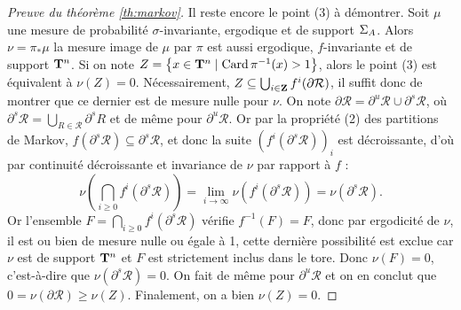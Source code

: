 \begin{proof}[Preuve du théorème \ref{th:markov}]
    Il reste encore le point (3) à démontrer.
    Soit $\mu$ une mesure de probabilité $\sigma$-invariante, ergodique et de support $\Sigma_A$.
    Alors $\nu = \pi_*\mu$ la mesure image de $\mu$ par $\pi$ est aussi ergodique, $f$-invariante et de support $\mathbf T^n$.
    Si on note $Z = \left\{x \in \mathbf T^n \mid \operatorname{Card}{\pi^{-1}(x)} > 1\right\}$, alors le point (3) est équivalent à $\nu(Z) = 0$.
    Nécessairement, $Z  \subseteq \bigcup_{i \in \mathbf Z}{f^i(\partial \mathcal R)}$,
    il suffit donc de montrer que ce dernier est de mesure nulle pour $\nu$.
    On note $\partial \mathcal R = \partial^u\mathcal R \cup \partial^s\mathcal R$,
    où $\partial^s \mathcal R = \bigcup_{R\in\mathcal R}\partial^s R$ et de même pour $\partial^u \mathcal R$.
    Or par la propriété (2) des partitions de Markov, $f(\partial^s\mathcal R) \subseteq \partial^s\mathcal R$,
    et donc la suite $(f^i(\partial^s\mathcal R))_i$ est décroissante,
    d'où par continuité décroissante et invariance de $\nu$ par rapport à $f$ :
    $$\nu\left(\bigcap_{i\geq 0}{f^i(\partial^s\mathcal R)}\right)
		    = \lim_{i\to\infty}{\nu\left(f^i(\partial^s\mathcal R)\right)} = \nu(\partial^s \mathcal R).$$
    Or l'ensemble $F = \bigcap_{i\geq 0}{f^i(\partial^s \mathcal R)}$ vérifie $f^{-1}(F) = F$,
    donc par ergodicité de $\nu$, il est ou bien de mesure nulle ou égale à 1,
    cette dernière possibilité est exclue car $\nu$ est de support $\mathbf T^n$ et $F$ est strictement inclus dans le tore.
    Donc $\nu(F) = 0$, c'est-à-dire que $\nu(\partial^s \mathcal R) = 0$.
    On fait de même pour $\partial^u \mathcal R$ et on en conclut que $0 = \nu(\partial \mathcal R) \geq \nu(Z)$.
    Finalement, on a bien $\nu(Z) = 0$.
  \end{proof}
